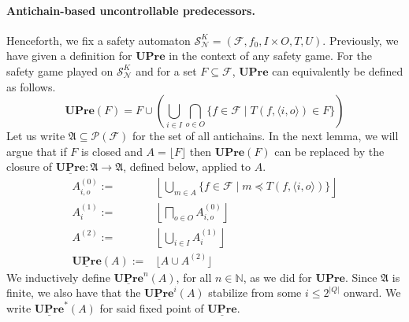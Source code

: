 \documentclass[runningheads,a4paper,draft]{llncs}
\newcommand{\pow}[1]{\mathcal{P}(#1)}
\newcommand{\upre}{\mathbf{UPre}}
\newcommand{\calF}{\mathcal{F}}
\newcommand{\calN}{\mathcal{N}}
\newcommand{\calS}{\mathcal{S}}
\newcommand{\frakA}{\mathfrak{A}}
\begin{document}
\paragraph{Antichain-based uncontrollable predecessors.}
Henceforth, we fix a safety
automaton $\calS^K_\calN = (\calF,f_0,I \times O, T,U)$.  Previously, we have given a
definition for $\upre$ in the context of any safety game. For the safety game
played on $\calS^K_\calN$ and for a set $F \subseteq \calF$, $\upre$ can equivalently be
defined as follows.
\[
  \upre(F) = F \cup \left( \bigcup_{i \in I} \bigcap_{o \in O}
  \{f \in \calF \mid T(f,\langle i, o \rangle) \in F\} \right)
\]
%
Let us write $\frakA \subseteq \pow{\calF}$ for the set of all antichains. In
the next lemma, we will argue that if $F$ is closed and $A = \lfloor F
\rfloor$ then $\upre(F)$ can be
replaced by the closure of $\underline{\upre} \colon \frakA \to \frakA$,
defined below, applied to $A$.
\begin{align*}
  A^{(0)}_{i,o} := {} &
  \left\lfloor \bigcup_{m \in A} \{f \in \calF \mid m \preceq
  T(f,\langle i, o \rangle) \} \right\rfloor\\
  A^{(1)}_{i} := {} &
  \left\lfloor \bigsqcap_{o \in O} A^{(0)}_{i,o} \right\rfloor\\
  A^{(2)} := {} &
  \left\lfloor \bigcup_{i \in I} A^{(1)}_i \right\rfloor\\
  \underline{\upre}(A) := {} &
  \lfloor A \cup A^{(2)} \rfloor
\end{align*}
We inductively define $\underline{\upre}^n(A)$, for all $n \in \mathbb{N}$, as
we did for $\upre$. Since $\frakA$ is finite, we also have that the
$\underline{\upre}^i(A)$ stabilize from some $i \leq 2^{|Q|}$ onward. We write
$\underline{\upre}^*(A)$ for said fixed point of $\underline{\upre}$.
\end{document}
